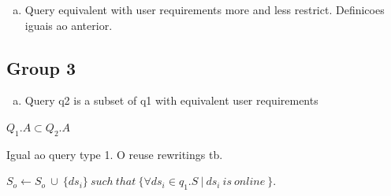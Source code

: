 \begin{enumerate}[b)]
\item Query equivalent with user requirements more and less restrict. Definicoes iguais ao anterior.
\end{enumerate}

\subsection{Group 3}

\begin{enumerate}[a)]
\item Query q2 is a subset of q1 with equivalent user requirements
\end{enumerate}

\begin{definition}
$Q_{1}.A \subset Q_{2}.A$
\end{definition}

\begin{definition}\label{def:??}
Igual ao query type 1. O reuse rewritings tb.
\begin{center}
$ S_{o} \leftarrow S_{o} \ \cup \ \lbrace ds_{i} \rbrace\ such\ that\ \lbrace \forall ds_{i} \in q_{1}.S \ \vert \ ds_{i} \ is \ online\ \rbrace$.
\end{center}
\end{definition}

